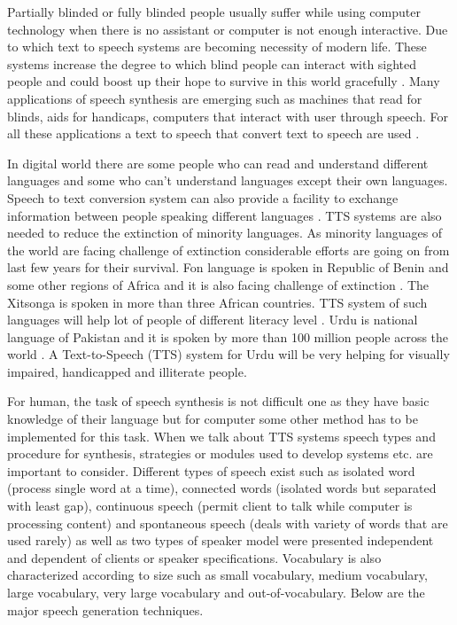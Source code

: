 Partially blinded or fully blinded people usually suffer while using computer technology when there is no assistant or 
computer is not enough interactive. Due to which text to speech systems are becoming necessity of modern life. 
These systems increase the degree to which blind people can interact with sighted 
people \cite{klatt1987review} and could boost up their hope to survive in this world 
gracefully \cite{eide2004corpus}. Many applications of speech synthesis are emerging such as 
machines that read for blinds, aids for handicaps, computers that interact with user through speech. 
For all these applications a text to
speech that convert text to speech are used \cite{klatt1982klattalk}.


In digital world there are some people who can read and understand different languages and some
who can’t understand languages except their own languages. Speech to text conversion system can
also provide a facility to exchange information between people speaking different languages \cite{khilari2015review}. 
TTS systems are also needed to reduce the extinction of
minority languages. As minority languages of the world are facing challenge of extinction
considerable efforts are going on from last few years for their survival. Fon language is spoken in
Republic of Benin and some other regions of Africa and it is also facing challenge of extinction \cite{dagba2014text}. 
The Xitsonga is spoken in more than three African countries.
TTS system of such languages will help lot of people of different literacy level \cite{baloyi2012text}.
Urdu is national language of Pakistan and it is spoken by more than 100 million people across the world \cite{top_30_languages}.
A Text-to-Speech (TTS) system for Urdu will be very helping for visually impaired, handicapped and illiterate people.

For human, the task of speech synthesis is not difficult one as they have basic knowledge of their
language but for computer some
other method has to be implemented for this task. When we talk about TTS systems speech types
and procedure for synthesis, strategies or modules used to develop systems etc. are important to
consider. Different types of speech exist such as isolated word (process single word at a time),
connected words (isolated words but separated with least gap), continuous speech (permit client
to talk while computer is processing content) and spontaneous speech (deals with variety of words
that are used rarely) as well as two types of speaker model were presented independent and
dependent of clients or speaker specifications. Vocabulary is also characterized according to size
such as small vocabulary, medium vocabulary, large vocabulary, very large vocabulary and out-of-vocabulary.
Below are the major speech generation techniques.

